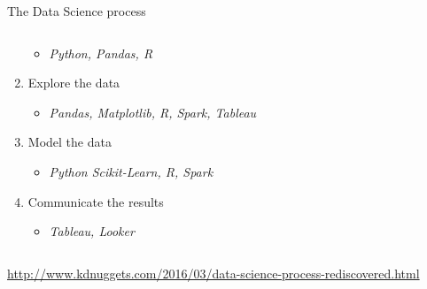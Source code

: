 \documentclass[11pt,xcolor=svgnames]{beamer}
\begin{document}
\begin{frame}{The Data Science process}
\begin{columns}[t]
\begin{column}[t]{.4\textwidth}
\begin{footnotesize}
\begin{enumerate}
          \begin{itemize}
          \item {\em \scriptsize Python, Pandas, R}
          \end{itemize}
        \item Explore the data
          \begin{itemize}
          \item {\em \scriptsize Pandas, Matplotlib, R, Spark, Tableau}
          \end{itemize}
        \item Model the data
          \begin{itemize}
          \item {\em \scriptsize Python Scikit-Learn, R, Spark}
          \end{itemize}
        \item Communicate the results
          \begin{itemize}
          \item {\em \scriptsize Tableau, Looker}
          \end{itemize}
        \end{enumerate}
      \end{footnotesize}
    \end{column}
  \end{columns}
  \begin{tiny}
    \url{http://www.kdnuggets.com/2016/03/data-science-process-rediscovered.html}
  \end{tiny}

\end{frame}
\end{document}

